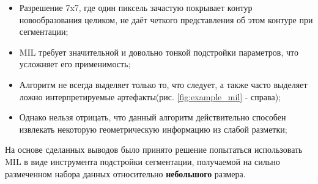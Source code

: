 \begin{itemize}
    \item Разрешение 7x7, где один пиксель зачастую покрывает контур новообразования целиком, не даёт четкого представления об этом контуре при сегментации;
    \item MIL требует значительной и довольно тонкой подстройки параметров, что усложняет его применимость;
    \item Алгоритм не всегда выделяет только то, что следует, а также часто выделяет ложно интерпретируемые артефакты(рис. \ref{fig:example_mil} - справа);
    \item Однако нельзя отрицать, что данный алгоритм действительно способен извлекать некоторую геометрическую информацию из слабой разметки;
    
\end{itemize}


На основе сделанных выводов было принято решение попытаться использовать MIL в виде инструмента подстройки сегментации, получаемой на сильно размеченном набора данных относительно {\bf небольшого} размера.

